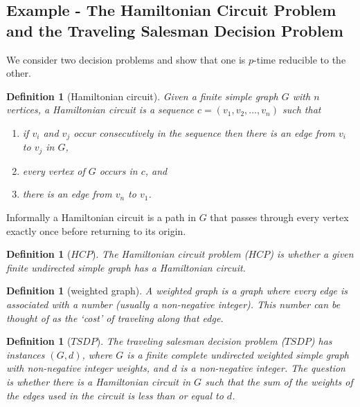 \documentclass{article}
\theoremstyle{plain}
\newtheorem{definition}[theorem]{Definition}{\bfseries}{\upshape}
\theoremstyle{definition}
\begin{document}
\subsection{Example - The Hamiltonian Circuit Problem and the Traveling Salesman Decision Problem}
We consider two decision problems and show that one is $p$-time reducible to the other.

\begin{definition}[Hamiltonian circuit] 
Given a finite simple graph $G$ with $n$ vertices, a Hamiltonian circuit is a sequence $c=(v_1,v_2,\ldots,v_n)$ such that
\begin{enumerate}
\item if $v_i$ and $v_j$ occur consecutively in the sequence then there is an edge from $v_i$ to  $v_j$ in $G$,
\item every vertex of $G$ occurs in $c$, and
\item there is an edge from $v_n$ to $v_1$.  
\end{enumerate}  
\end{definition}

Informally a Hamiltonian circuit is a path in $G$ that passes through every vertex exactly once before returning to its origin.

\begin{definition}[$HCP$]
The Hamiltonian circuit problem ($HCP$) is whether a given finite undirected simple graph has a Hamiltonian circuit.
\end{definition}

\begin{definition}[weighted graph]
A weighted graph is a graph where every edge is associated with a number (usually a non-negative integer). This number can be thought of as the `cost' of traveling along that edge.
\end{definition}

\begin{definition}[$TSDP$]\label{D:TSDP}
The traveling salesman decision problem ($TSDP$) has instances $(G,d)$, where $G$ is a finite complete undirected weighted simple graph with non-negative integer weights, and $d$ is a non-negative integer. The question is whether there is a Hamiltonian circuit in $G$ such that the sum of the weights of the edges used in the circuit is less than or equal to $d$. 
\end{definition}
\end{document}
